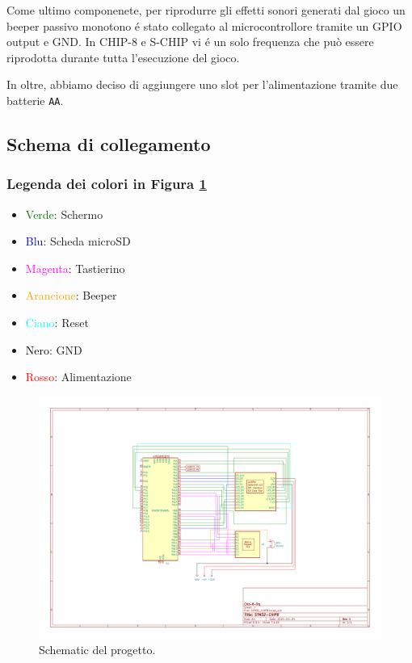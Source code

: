 \documentclass[a4paper]{article}
\begin{document}
Come ultimo componenete, per riprodurre gli effetti sonori generati dal gioco
un beeper passivo monotono é stato collegato al microcontrollore tramite un
GPIO output e GND. In CHIP-8 e S-CHIP vi é un solo frequenza che può
essere riprodotta durante tutta l'esecuzione del gioco.

In oltre, abbiamo deciso di aggiungere uno slot per l'alimentazione tramite
due batterie \texttt{AA}.

\subsection{Schema di collegamento}

\subsubsection{Legenda dei colori in Figura \ref{fig:schematic}}

\begin{itemize}
    \item \textcolor{green}{Verde}: Schermo
    \item \textcolor{blue}{Blu}: Scheda microSD
    \item \textcolor{magenta}{Magenta}: Tastierino
    \item \textcolor{orange}{Arancione}: Beeper
    \item \textcolor{cyan}{Ciano}: Reset
    \item \textcolor{black}{Nero}: GND
    \item \textcolor{red}{Rosso}: Alimentazione
\end{itemize}

\begin{figure}[h!t]
    \begin{center}
        \includegraphics[scale=0.50]{figures/STM32_CHIP8.pdf}
    \end{center}
    \caption{
        Schematic del progetto.
    }
    \label{fig:schematic}
\end{figure}
\end{document}
